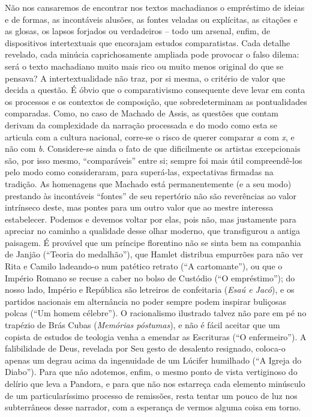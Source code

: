 Não nos cansaremos de encontrar nos textos machadianos o empréstimo de
ideias e de formas, as incontáveis alusões, as fontes veladas ou
explícitas, as citações e as glosas, os lapsos forjados ou verdadeiros
-- todo um arsenal, enfim, de dispositivos intertextuais que encorajam
estudos comparatistas. Cada detalhe revelado, cada minúcia
caprichosamente ampliada pode provocar o falso dilema: será o texto
machadiano muito mais rico ou muito menos original do que se pensava? A
intertextualidade não traz, por si mesma, o critério de valor que decida
a questão. É óbvio que o comparativismo consequente deve levar em conta
os processos e os contextos de composição, que sobredeterminam as
pontualidades comparadas. Como, no caso de Machado de Assis, as questões
que contam derivam da complexidade da narração processada e do modo como
esta se articula com a cultura nacional, corre-se o risco de querer
comparar \emph{a} com \emph{x}, e não com \emph{b}. Considere-se ainda o
fato de que dificilmente os artistas excepcionais são, por isso mesmo,
``comparáveis'' entre si; sempre foi mais útil compreendê-los pelo modo
como consideraram, para superá-las, expectativas firmadas na tradição.
As homenagens que Machado está permanentemente (e a seu modo) prestando
às incontáveis ``fontes'' de seu repertório não são reverências ao valor
intrínseco deste, mas pontes para um outro valor que ao mestre interessa
estabelecer. Podemos e devemos voltar por elas, pois não, mas justamente
para apreciar no caminho a qualidade desse olhar moderno, que
transfigurou a antiga paisagem. É provável que um príncipe florentino
não se sinta bem na companhia de Janjão (``Teoria do medalhão''), que
Hamlet distribua empurrões para não ver Rita e Camilo ladeando-o num
patético retrato (``A cartomante''), ou que o Império Romano se recuse a
caber no bolso de Custódio (``O empréstimo''); do nosso lado, Império e
República são letreiros de confeitaria (\emph{Esaú e Jacó}), e os
partidos nacionais em alternância no poder sempre podem inspirar
buliçosas polcas (``Um homem célebre''). O racionalismo ilustrado talvez
não pare em pé no trapézio de Brás Cubas (\emph{Memórias póstumas}), e
não é fácil aceitar que um copista de estudos de teologia venha a
emendar as Escrituras (``O enfermeiro''). A falibilidade de Deus,
revelada por Seu gesto de desalento resignado, coloca-o apenas um degrau
acima da ingenuidade de um Lúcifer humilhado (``A Igreja do Diabo'').
Para que não adotemos, enfim, o mesmo ponto de vista vertiginoso do
delírio que leva a Pandora, e para que não nos estarreça cada elemento
minúsculo de um particularíssimo processo de remissões, resta tentar um
pouco de luz nos subterrâneos desse narrador, com a esperança de vermos
alguma coisa em torno.

